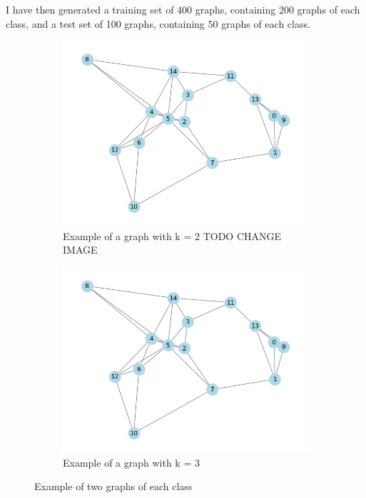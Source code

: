 \documentclass[a4paper,11pt]{article}
\begin{document}
I have then generated a training set of 400 graphs, containing 200 graphs of each class, and a test set of 100 graphs, containing 50 graphs of each class.\\

\begin{figure}[h]
    \centering
    \begin{subfigure}{0.4\textwidth}
        \includegraphics[width=\textwidth]{figures/graph_k3.png}
        \caption{Example of a graph with k = 2 TODO CHANGE IMAGE}
    \end{subfigure}
    \begin{subfigure}{0.4\textwidth}
        \includegraphics[width=\textwidth]{figures/graph_k3.png}
        \caption{Example of a graph with k = 3}
    \end{subfigure}
    \caption{Example of two graphs of each class}
\end{figure} 
\end{document}
